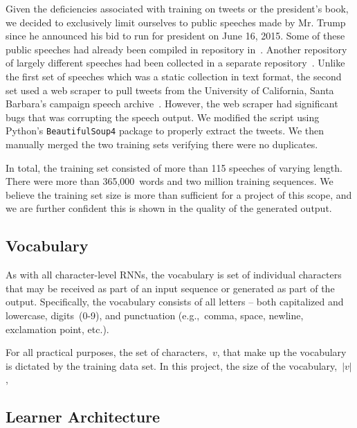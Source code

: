\documentclass{article}
\begin{document}
Given the deficiencies associated with training on tweets or the president's book, we decided to exclusively limit ourselves to public speeches made by Mr. Trump since he announced his bid to run for president on June 16, 2015.  Some of these public speeches had already been compiled in repository in~\cite{ryanMcdermottTrumpSpeeches}.  Another repository of largely different speeches had been collected in a separate repository~\cite{pedramNavidTrumpSpeeches}.  Unlike the first set of speeches which was a static collection in text format, the second set used a web scraper to pull tweets from the University of California, Santa Barbara's campaign speech archive~\cite{americanPresidencyProject}.  However, the web scraper had significant bugs that was corrupting the speech output.  We modified the script using Python's \texttt{BeautifulSoup4} package to properly extract the tweets.  We then manually merged the two training sets verifying there were no duplicates.

In total, the training set consisted of more than 115 speeches of varying length.  There were more than 365,000~words and two million training sequences.  We believe the training set size is more than sufficient for a project of this scope, and we are further confident this is shown in the quality of the generated output.

\subsection{Vocabulary}

As with all character-level RNNs, the vocabulary is set of individual characters that may be received as part of an input sequence or generated as part of the output.  Specifically, the vocabulary consists of all letters -- both capitalized and lowercase, digits~(0-9), and punctuation (e.g.,~comma, space, newline, exclamation point, etc.).  

For all practical purposes, the set of characters,~$v$, that make up the vocabulary is dictated by the training data set.  In this project, the size of the vocabulary,~$|v|$, 

\subsection{Learner Architecture}
\end{document}
